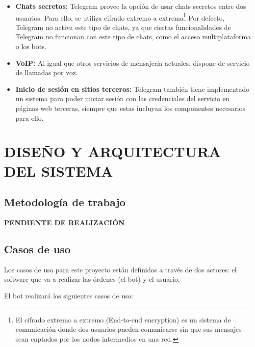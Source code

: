 \documentclass[spanish,12pt, a4paper, twoside]{paper}
\let\oldsection\section
\def\section{\cleardoublepage\oldsection}
\begin{document}
\begin{itemize}
\item \textbf{Chats secretos:} Telegram provee la opción de usar chats secretos entre dos usuarios. Para ello, se utiliza cifrado extremo a extremo\footnote{El cifrado extremo a extremo (End-to-end encryption) es un sistema de comunicación donde dos usuarios pueden comunicarse sin que sus mensajes sean captados por los nodos intermedios en una red.} Por defecto, Telegram no activa este tipo de chats, ya que ciertas funcionalidades de Telegram no funcionan con este tipo de chats, como el acceso multiplataforma o los bots.

\item \textbf{VoIP:} Al igual que otros servicios de mensajería actuales, dispone de servicio de llamadas por voz. 

\item \textbf{Inicio de sesión en sitios terceros:} Telegram también tiene implementado un sistema para poder iniciar sesión con las credenciales del servicio en páginas web terceras, siempre que estas incluyan los componentes necesarios para ello. 

\end{itemize}

\section{DISEÑO Y ARQUITECTURA DEL SISTEMA}

\subsection{Metodología de trabajo}

\textbf{PENDIENTE DE REALIZACIÓN}

\subsection{Casos de uso}

Los casos de uso para este proyecto están definidos a través de dos actores: el software que va a realizar las órdenes (el bot) y el usuario.

El bot realizará los siguientes casos de uso:
\end{document}
